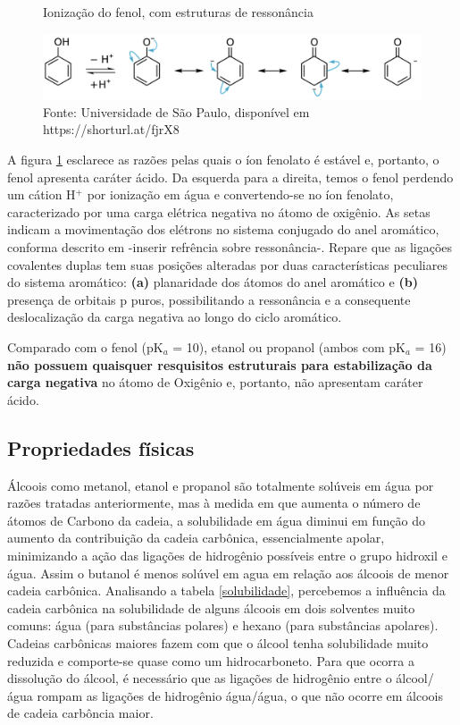 \begin{figure}[h]
\centering
\caption{Ionização do fenol, com estruturas de ressonância}
\vspace{0.5cm}
\label{fig:fenolfenolato}
\includegraphics[width=1\linewidth]{imagens/fenolato.png}
\caption*{Fonte: Universidade de São Paulo, disponível em https://shorturl.at/fjrX8}
\end{figure}

A figura \ref{fig:fenolfenolato} esclarece as razões pelas quais o íon fenolato é estável e, portanto, o fenol apresenta caráter ácido. Da esquerda para a direita, temos o fenol perdendo um cátion H$^+$ por ionização em água e convertendo-se no íon fenolato, caracterizado por uma carga elétrica negativa no átomo de oxigênio. As setas indicam a movimentação dos elétrons no sistema conjugado do anel aromático, conforma descrito em -inserir refrência sobre ressonância-.
Repare que as ligações covalentes duplas tem suas posições alteradas por duas características peculiares do sistema aromático: \textbf{(a)} planaridade dos átomos do anel aromático e \textbf{(b)} presença de orbitais p puros, possibilitando a ressonância e a consequente deslocalização da carga negativa ao longo do ciclo aromático.

Comparado com o fenol (pK$_a$ = 10), etanol ou propanol (ambos com pK$_a$ = 16) \textbf{não possuem quaisquer resquisitos estruturais para estabilização da carga negativa} no átomo de Oxigênio e, portanto, não apresentam caráter ácido.

\subsection{Propriedades físicas}
Álcoois como metanol, etanol e propanol são totalmente solúveis em água por razões tratadas anteriormente, mas à medida em que aumenta o número de átomos de Carbono da cadeia, a solubilidade em água diminui em função do aumento da contribuição da cadeia carbônica, essencialmente apolar, minimizando a ação das ligações de hidrogênio possíveis entre o grupo hidroxil e água. Assim o butanol é menos solúvel em agua em relação aos álcoois de menor cadeia carbônica. Analisando a tabela \ref{solubilidade}, percebemos a influência da cadeia carbônica na solubilidade de alguns álcoois em dois solventes muito comuns: água (para substâncias polares) e hexano (para substâncias apolares). Cadeias carbônicas maiores fazem com que o álcool tenha solubilidade muito reduzida e comporte-se quase como um hidrocarboneto. Para que ocorra a dissolução do álcool, é necessário que as ligações de hidrogênio entre o álcool/água rompam as ligações de hidrogênio água/água, o que não ocorre em álcoois de cadeia carbôncia maior.

